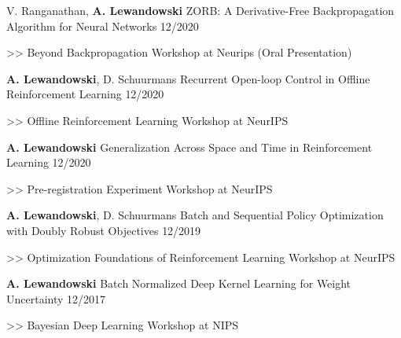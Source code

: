 \begin{cventries}
    \cventry
    {V. Ranganathan, \textbf{A. Lewandowski}}
    {ZORB: A Derivative-Free Backpropagation Algorithm for Neural Networks}
    {12/2020}
    {
      \begin{cvitems}
    	\item[>>] Beyond Backpropagation Workshop at Neurips (Oral
      Presentation)
      \end{cvitems}
    }

    \cventry
    { \textbf{A. Lewandowski}, D. Schuurmans}
    {Recurrent Open-loop Control in Offline Reinforcement Learning}
    {12/2020}
    {
      \begin{cvitems}
    	\item[>>] Offline Reinforcement Learning Workshop at NeurIPS
      \end{cvitems}
    }

    \cventry
    { \textbf{A. Lewandowski}}
    {Generalization Across Space and Time in Reinforcement Learning}
    {12/2020}
    {
      \begin{cvitems}
    	\item[>>] Pre-registration Experiment Workshop at NeurIPS
      \end{cvitems}
    }

    \cventry
    { \textbf{A. Lewandowski}, D. Schuurmans}
    {Batch and Sequential Policy Optimization with Doubly Robust Objectives}
    {12/2019}
    {
      \begin{cvitems}
    	\item[>>] Optimization Foundations of Reinforcement Learning Workshop at NeurIPS
      \end{cvitems}
    }


  \cventry
    {\textbf{A. Lewandowski}}
    {Batch Normalized Deep Kernel Learning for Weight Uncertainty}
    {12/2017}
    {
      \begin{cvitems}
    	\item[>>] Bayesian Deep Learning Workshop at NIPS
      \end{cvitems}
    }
  \end{cventries}

% 
% 
